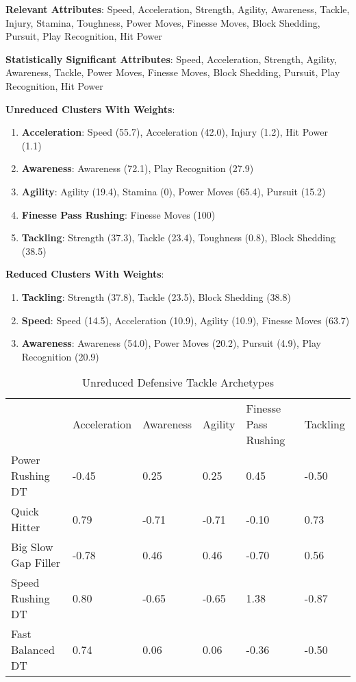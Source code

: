 \documentclass[11pt]{article}
\begin{document}
\textbf{Relevant Attributes}: Speed, Acceleration, Strength, Agility, Awareness, Tackle, Injury, Stamina, Toughness, Power Moves, Finesse Moves, Block Shedding, Pursuit, Play Recognition, Hit Power

\textbf{Statistically Significant Attributes}: Speed, Acceleration, Strength, Agility, Awareness, Tackle, Power Moves, Finesse Moves, Block Shedding, Pursuit, Play Recognition, Hit Power

\textbf{Unreduced Clusters With Weights}:

\begin{enumerate}
\item{\textbf{Acceleration}}: Speed (55.7), Acceleration (42.0), Injury (1.2), Hit Power (1.1)
\item{\textbf{Awareness}}: Awareness (72.1), Play Recognition (27.9)
\item{\textbf{Agility}}: Agility (19.4), Stamina (0), Power Moves (65.4), Pursuit (15.2)
\item{\textbf{Finesse Pass Rushing}}: Finesse Moves (100)
\item{\textbf{Tackling}}: Strength (37.3), Tackle (23.4), Toughness (0.8), Block Shedding (38.5)
\end{enumerate}

\textbf{Reduced Clusters With Weights}:

\begin{enumerate}
\item{\textbf{Tackling}}: Strength (37.8), Tackle (23.5), Block Shedding (38.8)
\item{\textbf{Speed}}: Speed (14.5), Acceleration (10.9), Agility (10.9), Finesse Moves (63.7)
\item{\textbf{Awareness}}: Awareness (54.0), Power Moves (20.2), Pursuit (4.9), Play Recognition (20.9)

\end{enumerate}

\begin{table}[]
\centering
\caption{Unreduced Defensive Tackle Archetypes}
\label{UnreducedDefensiveTackle}
\begin{tabular}{llllll}
                    & Acceleration & Awareness & Agility & Finesse Pass Rushing & Tackling \\
Power Rushing DT    & -0.45        & 0.25      & 0.25    & 0.45                 & -0.50    \\
Quick Hitter        & 0.79         & -0.71     & -0.71   & -0.10                & 0.73     \\
Big Slow Gap Filler & -0.78        & 0.46      & 0.46    & -0.70                & 0.56     \\
Speed Rushing DT    & 0.80         & -0.65     & -0.65   & 1.38                 & -0.87    \\
Fast Balanced DT    & 0.74         & 0.06      & 0.06    & -0.36                & -0.50   
\end{tabular}
\end{table}
\end{document}
